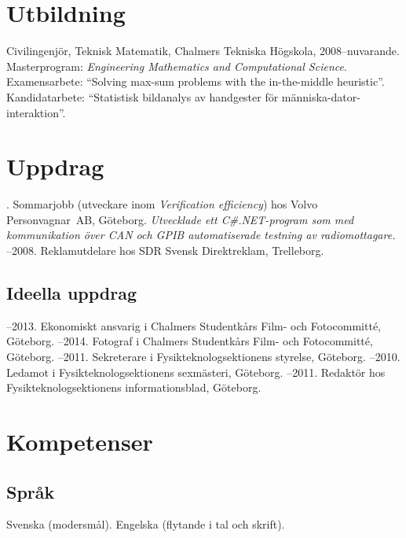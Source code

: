 \documentclass{skvitae}
\author{Simon Sigurdhsson}
\affiliation{}
\begin{document}
	\RaggedRight
	\maketitle


	\section{Utbildning}
	\ind Civilingenjör, Teknisk Matematik, Chalmers Tekniska Högskola, 2008--nuvarande.%
	\ind Masterprogram: \emph{Engineering Mathematics and Computational Science}.%
	\ind Examensarbete: \foreignquote{english}{Solving max-sum problems with the in-the-middle heuristic}.%
	\ind Kandidatarbete: \enquote{Statistisk bildanalys av handgester för människa-dator-interaktion}.

	\section{Uppdrag}
	. Sommarjobb (utveckare inom \emph{Verification efficiency}) hos Volvo Person\-vagnar~AB, Göteborg. %
	    \textit{Utvecklade ett C\#.NET-program som med kommunikation över CAN och GPIB automatiserade testning av radiomottagare.}
	--2008. Reklamutdelare hos SDR Svensk Direktreklam, Trelleborg.

	\medskip
	\subsection{Ideella uppdrag}
	--2013. Ekonomiskt ansvarig i Chalmers Studentkårs Film- och Fotocommitté, Göteborg.
	--2014. Fotograf i Chalmers Studentkårs Film- och Fotocommitté, Göteborg.
	--2011. Sekreterare i Fysikteknologsektionens styrelse, Göteborg.
	--2010. Ledamot i Fysikteknologsektionens sexmästeri, Göteborg.
	--2011. Redaktör hos Fysikteknologsektionens informationsblad, Göteborg.

	\section{Kompetenser}
	\subsection{Språk}
	\ind Svenska (modersmål).
	\ind Engelska (flytande i tal och skrift).
\end{document}
